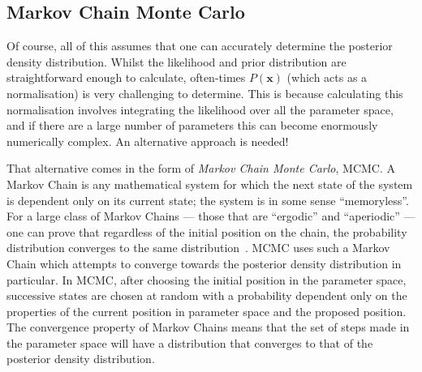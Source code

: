 \subsection{Markov Chain Monte Carlo}
Of course, all of this assumes that one can accurately determine the posterior density distribution. Whilst the likelihood and prior distribution are straightforward enough to calculate, often-times $P\left(\bm{x}\right)$ (which acts as a normalisation) is very challenging to determine. This is because calculating this normalisation involves integrating the likelihood over all the parameter space, and if there are a large number of parameters this can become enormously numerically complex. An alternative approach is needed!

That alternative comes in the form of \textit{Markov Chain Monte Carlo}, MCMC. A Markov Chain is any mathematical system for which the next state of the system is dependent only on its current state; the system is in some sense ``memoryless''. For a large class of Markov Chains --- those that are ``ergodic'' and ``aperiodic'' --- one can prove that regardless of the initial position on the chain, the probability distribution converges to the same distribution~\cite{fellerIntroductionProbabilityTheory1968}. %
MCMC uses such a Markov Chain which attempts to converge towards the posterior density distribution in particular. In MCMC, after choosing the initial position in the parameter space, successive states are chosen at random with a probability dependent only on the properties of the current position in parameter space and the proposed position. The convergence property of Markov Chains means that the set of steps made in the parameter space will have a distribution that converges to that of the posterior density distribution.


